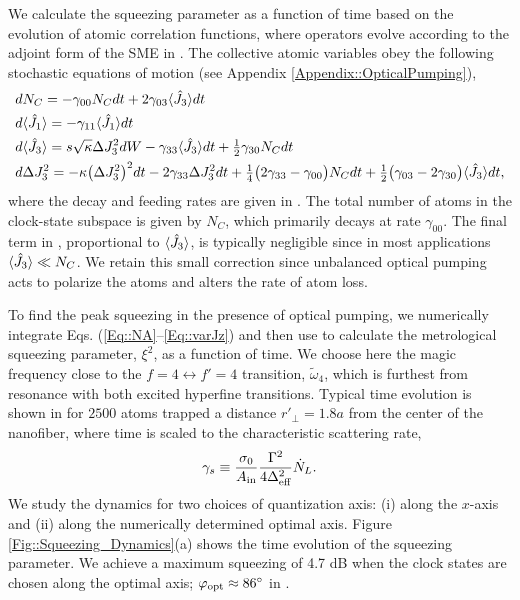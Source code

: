 \documentclass[preprint, aps,pra,onecolumn]{revtex4-1} %
\newcommand{\varz}{\Delta J_3^2}
\newcommand{\qangle}{\varphi}
\newcommand{\magic}[1]{\tilde{\omega}_{#1}}
\begin{document}
We calculate the squeezing parameter as a function of time based on the evolution of atomic correlation functions, where operators evolve according to the adjoint form of the SME in .  The collective atomic variables obey the following stochastic equations of motion (see Appendix \ref{Appendix::OpticalPumping}),
\begin{subequations}\label{Eq::collectivedynamics}
	\begin{align} 
		&d N_C = -\gamma_{00} N_C dt + 2\gamma_{03} \expt{\hat{J}_3} dt \label{Eq::NA}\\
		&d \expt{\hat{J}_1}  = -\gamma_{11} \expt{\hat{J}_1} dt  \label{Eq::MeanSpinDecay} \\
		&d \expt{\hat{J}_3}  = s\sqrt{\kappa} \varz dW -\gamma_{33} \expt{\hat{J}_3}dt + \smallfrac{1}{2}\gamma_{30} N_C dt   \\
		&d \varz  = - \kappa \big(\varz\big)^2 dt- 2 \gamma_{33} \varz dt + \smallfrac{1}{4} \big( 2\gamma_{33}-\gamma_{00} \big) N_C dt + \smallfrac{1}{2} \big( \gamma_{03} - 2 \gamma_{30} \big) \expt{\hat{J}_3} dt,   \label{Eq::varJz} 
	\end{align}
\end{subequations}
where the decay and feeding rates are given in .
The total number of atoms in the clock-state subspace is given by $N_C$, which primarily decays at rate $\gamma_{00}$. 
The final term in , proportional to $\langle{\hat{J}_3}\rangle$, is typically negligible since in most applications $\langle{\hat{J}_3}\rangle \ll N_C$.  
We retain this small correction since unbalanced optical pumping acts to polarize the atoms and alters the rate of atom loss.  

To find the peak squeezing in the presence of optical pumping, we numerically integrate Eqs. (\ref{Eq::NA}--\ref{Eq::varJz}) and then use  to calculate the metrological squeezing parameter, $\xi^2$, as a function of time. 
We choose here the magic frequency close to the $ f=4\leftrightarrow f'=4 $ transition, $ \magic{4} $, which is furthest from resonance with both excited hyperfine transitions. 
Typical time evolution is shown in  for $2500$ atoms trapped a distance $r'\!_\perp=1.8a$ from the center of the nanofiber, where time is scaled to the characteristic scattering rate, 
\begin{align}\label{Eq::gamma_s}
\gamma_s \equiv \frac{\sigma_0}{A_{\rm in}}\frac{\Gamma^2}{4 \Delta_{\text{eff}}^2} \dot{N}_L .
\end{align}  
We study the dynamics for two choices of quantization axis: (i) along the $x$-axis and (ii) along the numerically determined optimal axis.  Figure \ref{Fig::Squeezing_Dynamics}(a) shows the time evolution of the squeezing parameter.  We achieve a maximum squeezing of 4.7 dB when the clock states are chosen along the optimal axis; $\qangle_{\rm opt} \approx 86^\circ$ in . 
\end{document}
